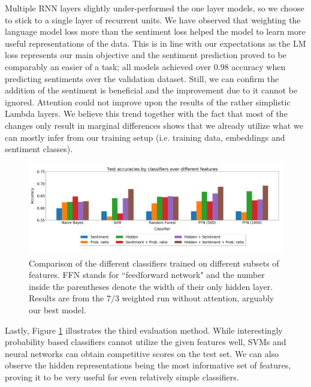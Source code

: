 \documentclass{article}
\begin{document}
\par Multiple RNN layers slightly under-performed the one layer models, so we choose to stick to a single layer of recurrent units. We have observed that weighting the language model loss more than the sentiment loss helped the model to learn more useful representations of the data. This is in line with our expectations as the LM loss represents our main objective and the sentiment prediction proved to be comparably an easier of a task; all models achieved over $0.98$ accuracy when predicting sentiments over the validation dataset. Still, we can confirm the addition of the sentiment is beneficial and the improvement due to it cannot be ignored. Attention could not improve upon the results of the rather simplistic Lambda layers. We believe this trend \textemdash together with the fact that most of the changes only result in marginal differences \textemdash shows that we already utilize what we can mostly infer from our training setup (i.e. training data, embeddings and sentiment classes).

\begin{figure}[htbp]
\includegraphics[width=\textwidth]{plot_wide.png}
\centering
\caption{Comparison of the different classifiers trained on different subsets of features. FFN stands for ``feedforward network" and the number inside the parentheses denote the width of their only hidden layer. Results are from the $7/3$ weighted run without attention, arguably our best model.}
\label{fig:classifier-res}
\end{figure}

\par Lastly, Figure \ref{fig:classifier-res} illustrates the third evaluation method. While interestingly probability based classifiers cannot utilize the given features well, SVMs and neural networks can obtain competitive scores on the test set. We can also observe the hidden representations being the most informative set of features, proving it to be very useful for even relatively simple classifiers.
\end{document}
